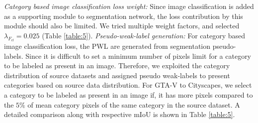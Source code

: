 \documentclass[10pt,twocolumn,letterpaper]{article}
\begin{document}
\begin{comment}
\begin{table}[H]
\footnotesize
\centering
\caption{A comparative analysis of PWL generation with respect to mIoU.}
\begin{tabular}{ccccc}
\hline
\multicolumn{5}{c}{GTA-V $\rightarrow$ Cityscapes} \\
\hline
$\eta$& 0.0  & 0.1        & 0.05       & 0.025                \\
mIoU (SISC-PWL)           &45.5    & 46.0       & 49.0       & 47.33   \\
\hline
\end{tabular}
\label{table:6}
\end{table}
\end{comment}
\textit{Category based image classification loss weight:} Since image classification is added as a supporting module to segmentation network, the loss contribution by this module should also be limited. We tried multiple weight factors, and selected $\lambda_{F_{cl}} = 0.025$ (Table \ref{table:5}).
\textit{Pseudo-weak-label generation:} For category based image classification loss, the PWL are generated from segmentation pseudo-labels. Since it is difficult to set a minimum number of pixels limit for a category to be labeled as present in an image. Therefore, we exploited the category distribution of source datasets and assigned pseudo weak-labels to present categories based on source data distribution. For GTA-V to Cityscapes, we select a category to be labeled as present in an image if, it has more pixels compared to the $5\%$ of mean category pixels of the same category in the source dataset. 
A detailed comparison along with respective mIoU is shown in Table \ref{table:5}.

\vspace{-0.2cm}
\end{document}

